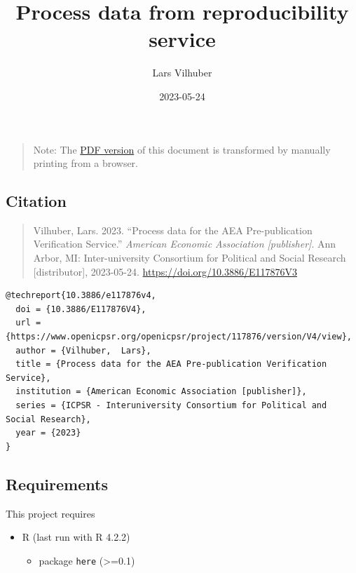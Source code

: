 \documentclass[
]{article}
\title{Process data from reproducibility service}
\author{Lars Vilhuber}
\date{2023-05-24}
\providecommand{\tightlist}{%
  \setlength{\itemsep}{0pt}\setlength{\parskip}{0pt}}
\begin{document}
\maketitle

{
\setcounter{tocdepth}{2}
\tableofcontents
}
\begin{quote}
Note: The
\href{https://aeadataeditor.github.io/processing-jira-process-data/README.pdf}{PDF
version} of this document is transformed by manually printing from a
browser.
\end{quote}

\hypertarget{citation}{%
\subsection{Citation}\label{citation}}

\begin{quote}
Vilhuber, Lars. 2023. ``Process data for the AEA Pre-publication
Verification Service.'' \emph{American Economic Association
{[}publisher{]}}. Ann Arbor, MI: Inter-university Consortium for
Political and Social Research {[}distributor{]}, 2023-05-24.
\href{https://doi.org/10.3886/E117876V4}{https://doi.org/10.3886/E117876V3}
\end{quote}

\begin{verbatim}
@techreport{10.3886/e117876v4,
  doi = {10.3886/E117876V4},
  url = {https://www.openicpsr.org/openicpsr/project/117876/version/V4/view},
  author = {Vilhuber,  Lars},
  title = {Process data for the AEA Pre-publication Verification Service},
  institution = {American Economic Association [publisher]},
  series = {ICPSR - Interuniversity Consortium for Political and Social Research},
  year = {2023}
}
\end{verbatim}

\hypertarget{requirements}{%
\subsection{Requirements}\label{requirements}}

This project requires

\begin{itemize}
\tightlist
\item
  R (last run with R 4.2.2)

  \begin{itemize}
  \tightlist
  \item
    package \texttt{here} (\textgreater=0.1)
  \end{itemize}
\end{itemize}
\end{document}
